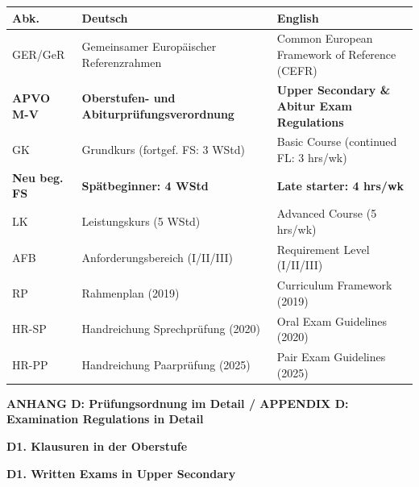 \documentclass[10pt,a4paper]{article}
\newcommand{\secbil}[2]{%
\vspace{6pt}
\noindent\colorbox{spaet}{\parbox{0.48\textwidth}{\color{white}\bfseries\small #1}}%
\hfill%
\colorbox{english}{\parbox{0.48\textwidth}{\color{white}\bfseries\small #2}}
\vspace{3pt}
}
\begin{document}
\begin{center}
\scriptsize
\begin{tabular}{|l|p{5cm}|p{5cm}|}
\hline
\rowcolor{lightgray}
\textbf{Abk.} & \textbf{Deutsch} & \textbf{English} \\
\hline
GER/GeR & Gemeinsamer Europäischer Referenzrahmen & Common European Framework of Reference (CEFR) \\
\hline
\textbf{APVO M-V} & \textbf{Oberstufen- und Abiturprüfungsverordnung} & \textbf{Upper Secondary \& Abitur Exam Regulations} \\
\hline
GK & Grundkurs (fortgef. FS: 3 WStd) & Basic Course (continued FL: 3 hrs/wk) \\
\hline
\textcolor{spaet}{\textbf{Neu beg. FS}} & \textcolor{spaet}{\textbf{Spätbeginner: 4 WStd}} & \textcolor{spaet}{\textbf{Late starter: 4 hrs/wk}} \\
\hline
LK & Leistungskurs (5 WStd) & Advanced Course (5 hrs/wk) \\
\hline
AFB & Anforderungsbereich (I/II/III) & Requirement Level (I/II/III) \\
\hline
RP & Rahmenplan (2019) & Curriculum Framework (2019) \\
\hline
HR-SP & Handreichung Sprechprüfung (2020) & Oral Exam Guidelines (2020) \\
\hline
HR-PP & Handreichung Paarprüfung (2025) & Pair Exam Guidelines (2025) \\
\hline
\end{tabular}
\end{center}

\newpage

\begin{center}
\colorbox{spaet}{\parbox{0.95\textwidth}{\centering\color{white}\Large\bfseries\vspace{4pt}
ANHANG D: Prüfungsordnung im Detail / APPENDIX D: Examination Regulations in Detail
\vspace{4pt}}}
\end{center}

\vspace{4mm}

\secbil{D1. Klausuren in der Oberstufe}{D1. Written Exams in Upper Secondary}

\vspace{2mm}
\end{document}
